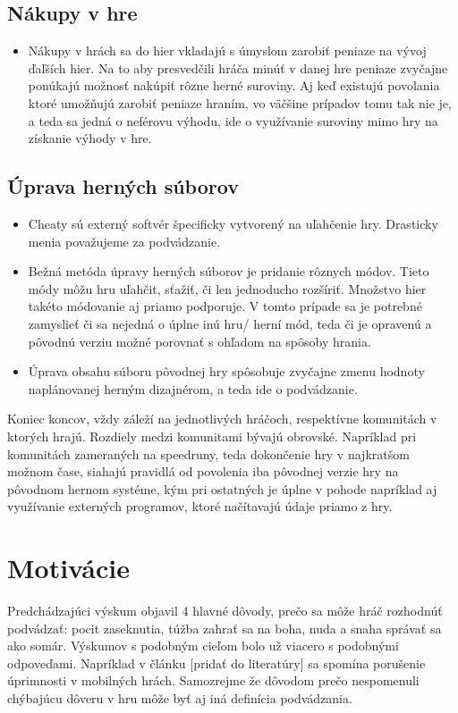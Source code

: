 \documentclass[10pt,twoside,slovak,a4paper]{article}
\begin{document}
\subsection{Nákupy v hre}
\begin{itemize}
\item Nákupy v hrách sa do hier vkladajú s úmyslom zarobiť peniaze na vývoj ďaľších hier. Na to aby presvedčili hráča minúť v danej hre peniaze zvyčajne ponúkajú možnosť nakúpiť rôzne herné suroviny. Aj keď existujú povolania ktoré umožňujú zarobiť peniaze hraním, vo väčšine prípadov tomu tak nie je, a teda sa jedná o neférovu výhodu, ide o využívanie suroviny mimo hry na získanie výhody v hre.
\end{itemize}

\subsection{Úprava herných súborov}
\begin{itemize}
\item Cheaty sú externý softvér špecificky vytvorený na uľahčenie hry. Drasticky menia považujeme za podvádzanie.
\item Bežná metóda úpravy herných súborov je pridanie rôznych módov. Tieto módy môžu hru uľahčit, sťažiť, či len jednoducho rozšíriť. Množstvo hier takéto módovanie aj priamo podporuje. V tomto prípade sa je potrebné zamyslieť či sa nejedná o úplne inú hru/ herní mód, teda či je opravenú a pôvodnú verziu možné porovnať s ohľadom na spôsoby hrania.
\item Úprava obsahu súboru pôvodnej hry spôsobuje zvyčajne zmenu hodnoty naplánovanej herným dizajnérom, a teda ide o podvádzanie.
\end{itemize}

Koniec koncov, vždy záleží na jednotlivých hráčoch, respektívne komunitách v ktorých hrajú. Rozdiely medzi komunitami bývajú obrovské. Napríklad pri komunitách zameraných na speedruny, teda dokončenie hry v najkratšom možnom čase, siahajú pravidlá od povolenia iba pôvodnej verzie hry na pôvodnom hernom systéme, kým pri ostatných je úplne v pohode napríklad aj využívanie externých programov, ktoré načítavajú údaje priamo z hry.

\section{Motivácie}%

Predchádzajúci výskum objavil 4 hlavné dôvody, prečo sa môže hráč rozhodnúť podvádzať: pocit zaseknutia, túžba zahrať sa na boha, nuda a snaha správať sa ako somár.\cite{mood} Výskumov s podobným cieľom bolo už viacero s podobnými odpoveďami. Napríklad v článku [pridať do literatúry] sa spomína porušenie úprimnosti v mobilných hrách. Samozrejme že dôvodom prečo nespomenuli chýbajúcu dôveru v hru môže byť aj iná definícia podvádzania.
\end{document}
